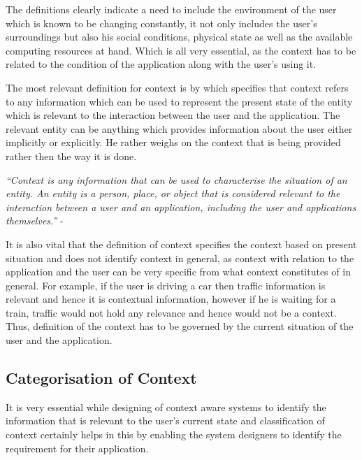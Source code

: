 \documentclass[12pt]{report}
\begin{document}
The definitions clearly indicate a need to include the environment of the user which is known to be changing constantly, it not only includes the user's surroundings but also his social conditions, physical state as well as the available computing resources at hand. Which is all very essential, as the context has to be related to the condition of the application along with the user's using it.


The most relevant definition for context is by \cite{dey2001understanding} which specifies that context refers to any information which can be used to represent the present state of the entity which is relevant to the interaction between the user and the application. The relevant entity can be anything which provides information about the user either implicitly or explicitly. He rather weighs on the context that is being provided rather then the way it is done. 


\textit{``Context is any information that can be used to characterise the situation of an entity. An entity is a person, place, or object that is considered relevant to the interaction between a user and an application, including the user and applications themselves.''} - \cite{dey2001understanding}


It is also vital that the definition of context specifies the context based on present situation and does not identify context in general, as context with relation to the application and the user can be very specific from what context constitutes of in general. For example, if the user is driving a car then traffic information is relevant and hence it is contextual information, however if he is waiting for a train, traffic would not hold any relevance and hence would not be a context. Thus, definition of the context has to be governed by the current situation of the user and the application.

\subsection{Categorisation of Context}

It is very essential while designing of context aware systems to identify the information that is relevant to the user's current state and classification of context certainly helps in this by enabling the system designers to identify the requirement for their application.
\end{document}

